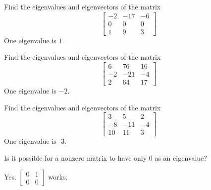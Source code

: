 \documentclass{ximera}
\begin{document}
\begin{problem}\label{prb:8.10} Find the eigenvalues and eigenvectors of the matrix
\begin{equation*}
\left[
\begin{array}{rrr}
-2 & -17 & -6 \\
0 & 0 & 0 \\
1 & 9 & 3
\end{array}
\right]
\end{equation*}
One eigenvalue is $1.$
\end{problem}

\begin{problem}\label{prb:8.12} Find the eigenvalues and eigenvectors of the matrix
\begin{equation*}
\left[
\begin{array}{rrr}
6 & 76 & 16 \\
-2 & -21 & -4 \\
2 & 64 & 17
\end{array}
\right]
\end{equation*}
One eigenvalue is $-2.$
\end{problem}

\begin{problem}\label{prb:8.13} Find the eigenvalues and eigenvectors of the matrix
\begin{equation*}
\left[
\begin{array}{rrr}
3 & 5 & 2 \\
-8 & -11 & -4 \\
10 & 11 & 3
\end{array}
\right]
\end{equation*}
One eigenvalue is -3.
\end{problem}

\begin{problem}\label{prb:8.14} Is it possible for a nonzero matrix to have only $0$ as an eigenvalue?

\begin{hint}
Yes. $\left[
\begin{array}{cc}
0 & 1 \\
0 & 0%
\end{array}
\right] $ works.
\end{hint}
\end{problem}
\end{document}

